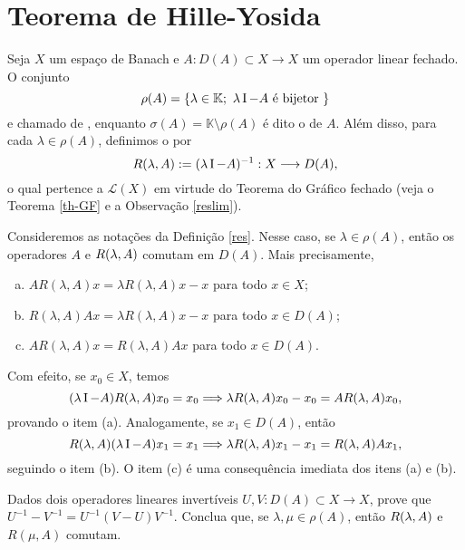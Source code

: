\section{Teorema de Hille-Yosida}



\begin{definition}\label{res}
Seja $X$ um espaço de Banach e $A:D(A)\subset X\longrightarrow X$ um operador linear fechado. O conjunto  
\[\rho(A)=\{\lambda \in \mathbb{K};\ \lambda \operatorname{I} -A \text{ é bijetor }\}\]
e chamado de , enquanto $\sigma(A)=\mathbb{K}\setminus\rho(A)$ é dito o   de $A$. Além disso, para cada $\lambda\in \rho(A)$, definimos o    por
\[R(\lambda,A):=(\lambda \operatorname{I} -A)^{-1}: X\longrightarrow D(A),\]
o qual pertence a $\mathcal L (X)$ em virtude do Teorema do Gráfico fechado (veja o Teorema \ref{th-GF} e a Observação \ref{reslim}).

\begin{remark}\label{rl}
    Consideremos as notações da Definição \ref{res}. Nesse caso, se $\lambda \in \rho(A)$, então os operadores $A$ e $R(\lambda,A)$ comutam em $D(A)$. Mais precisamente,
    \begin{enumerate}[(a)]
    \item $AR(\lambda ,A)x = \lambda R(\lambda ,A)x-x$ para todo $x\in X$;
    \item $R(\lambda ,A)Ax = \lambda R(\lambda ,A)x-x$ para todo $x\in D(A)$;
    \item $AR(\lambda ,A)x =R(\lambda ,A)Ax  $ para todo $x\in D(A)$.
    \end{enumerate}
    Com efeito, se $x_0\in X$, temos
\begin{equation*}
(\lambda \operatorname{I} -A)R(\lambda,A)x_0=x_0 \Longrightarrow \lambda R(\lambda,A) x_0 -x_0 =AR(\lambda,A) x_0 ,
\end{equation*}
provando o item (a). Analogamente, se $x_1 \in D(A)$, então
\begin{equation*}
R(\lambda,A)(\lambda \operatorname{I} -A)x_1 =x_1 \Longrightarrow \lambda R(\lambda,A) x_1-x_1 =R(\lambda,A) Ax_1 ,
\end{equation*}
seguindo o item (b). O item (c) é uma consequência imediata dos itens (a) e (b).
\end{remark}


\begin{xca}\label{comutam}
Dados dois operadores lineares invertíveis $U,V:D(A)\subset X\longrightarrow X$, prove que $U^{-1}-V^{-1} = U^{-1} (V-U)V^{-1}$. Conclua que, se $\lambda, \mu\in \rho(A)$, então $R(\lambda,A)$ e $R(\mu,A)$ comutam.  
\end{xca}

\end{definition}

